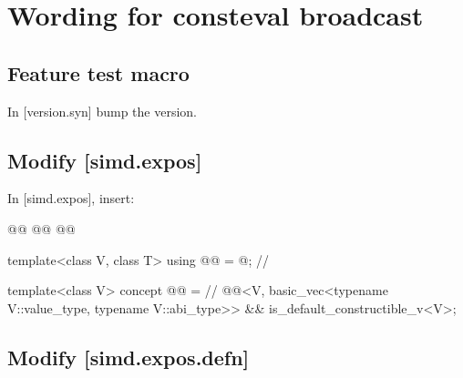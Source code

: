 \section{Wording for consteval broadcast}

\subsection{Feature test macro}

In [version.syn] bump the  version.

\subsection{Modify [simd.expos]}

In [simd.expos], insert:
\begin{wgText}
\begin{codeblock}
@@
  @@                  @\wgAdd{\rmfamily\itshape// \expos}@

template<class V, class T> using @@ = @\seebelow@; // \expos

template<class V>
  concept @@ =                                            // \expos
    @@<V, basic_vec<typename V::value_type, typename V::abi_type>> &&
    is_default_constructible_v<V>;
\end{codeblock}
\end{wgText}

\subsection{Modify [simd.expos.defn]}

